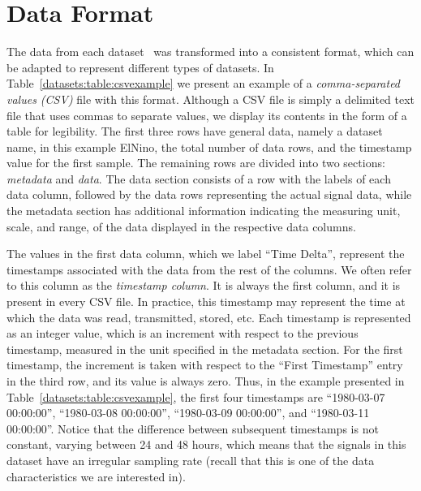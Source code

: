 
\clearpage
\section{Data Format}
\label{datasets:over}


The data from each dataset \dataCite\ was transformed into a consistent format, which can be adapted to represent different types of datasets. In Table~\ref{datasets:table:csvexample} we present an example of a \textit{comma-separated values (CSV)} file with this format. Although a CSV file is simply a delimited text file that uses commas to separate values, we display its contents in the form of a table for legibility. The first three rows have general data, namely a dataset name, in this example ElNino, the total number of data rows, and the timestamp value for the first sample. The remaining rows are divided into two sections: \textit{metadata} and \textit{data}. The data section consists of a row with the labels of each data column, followed by the data rows representing the actual signal data, while the metadata section has additional information indicating the measuring unit, scale, and range, of the data displayed in the respective data columns.





\vspace{-5pt}
The values in the first data column, which we label ``Time Delta'', represent the timestamps associated with the data from the rest of the columns. We often refer to this column as the \textit{timestamp column}. It is always the first column, and it is present in every CSV file. In practice, this timestamp may represent the time at which the data was read, transmitted, stored, etc. Each timestamp is represented as an integer value, which is an increment with respect to the previous timestamp, measured in the unit specified in the metadata section. For the first timestamp, the increment is taken with respect to the ``First Timestamp'' entry in the third row, and its value is always zero. Thus, in the example presented in Table~\ref{datasets:table:csvexample}, the first four timestamps are ``1980-03-07 00:00:00'', ``1980-03-08 00:00:00'', ``1980-03-09 00:00:00'', and ``1980-03-11 00:00:00''. Notice that the difference between subsequent timestamps is not constant, varying between 24 and 48 hours, which means that the signals in this dataset have an irregular sampling rate (recall that this is one of the data characteristics we are interested in).


